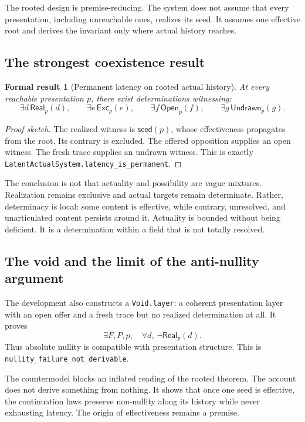 \documentclass[11pt]{article}
\newtheorem{formalresult}{Formal result}[section]
\theoremstyle{definition}
\theoremstyle{remark}
\newcommand{\lean}[1]{\nolinkurl{#1}}
\newcommand{\Real}{\mathsf{Real}}
\newcommand{\Exc}{\mathsf{Exc}}
\newcommand{\Opn}{\mathsf{Open}}
\newcommand{\Und}{\mathsf{Undrawn}}
\newcommand{\Seed}{\mathsf{seed}}
\begin{document}
The rooted design is premise-reducing. The system does not assume that every
presentation, including unreachable ones, realizes its seed. It assumes one
effective root and derives the invariant only where actual history reaches.

\subsection{The strongest coexistence result}

\begin{formalresult}[Permanent latency on rooted actual history]
At every reachable presentation \(p\), there exist determinations witnessing:
\[
  \exists d\,\Real_p(d),\qquad
  \exists e\,\Exc_p(e),\qquad
  \exists f\,\Opn_p(f),\qquad
  \exists g\,\Und_p(g).
\]
\end{formalresult}

\begin{proof}[Proof sketch]
The realized witness is \(\Seed(p)\), whose effectiveness propagates from the
root. Its contrary is excluded. The offered opposition supplies an open
witness. The fresh trace supplies an undrawn witness. This is exactly
\lean{LatentActualSystem.latency_is_permanent}.
\end{proof}

The conclusion is not that actuality and possibility are vague mixtures.
Realization remains exclusive and actual targets remain determinate. Rather,
determinacy is local: some content is effective, while contrary, unresolved,
and unarticulated content persists around it. Actuality is bounded without
being deficient. It is a determination within a field that is not totally
resolved.

\subsection{The void and the limit of the anti-nullity argument}

The development also constructs a \lean{Void.layer}: a coherent presentation
layer with an open offer and a fresh trace but no realized determination at
all. It proves
\[
  \exists F,P,p,\quad \forall d,\ \neg\Real_p(d).
\]
Thus absolute nullity is compatible with presentation structure. This is
\lean{nullity_failure_not_derivable}.

The countermodel blocks an inflated reading of the rooted theorem. The account
does not derive something from nothing. It shows that once one seed is
effective, the continuation laws preserve non-nullity along its history while
never exhausting latency. The origin of effectiveness remains a premise.
\end{document}
